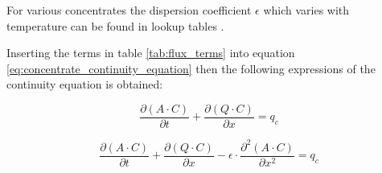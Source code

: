 For various concentrates the dispersion coefficient $\epsilon$ which varies with temperature can be found in lookup tables \cite{karlruhe_con_def_dif_equation}.

Inserting the terms in table \ref{tab:flux_terms} into equation \ref{eq:concentrate_continuity_equation} then the following expressions of the continuity equation is obtained:

\begin{equation}
	\frac{\partial (A\cdot C)}{\partial t} + \frac{\partial (Q \cdot C)}{\partial x} = q_c 
\label{eq:concentrate_continuity_equation_convective}
\end{equation}

\begin{equation}
	\frac{\partial (A\cdot C)}{\partial t} + \frac{\partial (Q \cdot C)}{\partial x} - \epsilon \cdot \frac{\partial^2 (A \cdot C)}{\partial x^2} = q_c 
\label{eq:concentrate_continuity_equation_dispersion}
\end{equation}

